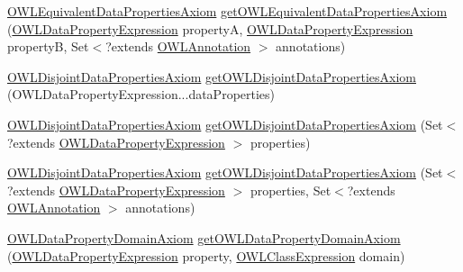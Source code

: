 \begin{DoxyCompactItemize}
\item 
\hyperlink{interfaceorg_1_1semanticweb_1_1owlapi_1_1model_1_1_o_w_l_equivalent_data_properties_axiom}{O\-W\-L\-Equivalent\-Data\-Properties\-Axiom} \hyperlink{interfaceorg_1_1semanticweb_1_1owlapi_1_1model_1_1_o_w_l_data_factory_af0a3a9be69190ea4a642af9ce9a922a2}{get\-O\-W\-L\-Equivalent\-Data\-Properties\-Axiom} (\hyperlink{interfaceorg_1_1semanticweb_1_1owlapi_1_1model_1_1_o_w_l_data_property_expression}{O\-W\-L\-Data\-Property\-Expression} property\-A, \hyperlink{interfaceorg_1_1semanticweb_1_1owlapi_1_1model_1_1_o_w_l_data_property_expression}{O\-W\-L\-Data\-Property\-Expression} property\-B, Set$<$?extends \hyperlink{interfaceorg_1_1semanticweb_1_1owlapi_1_1model_1_1_o_w_l_annotation}{O\-W\-L\-Annotation} $>$ annotations)
\item 
\hyperlink{interfaceorg_1_1semanticweb_1_1owlapi_1_1model_1_1_o_w_l_disjoint_data_properties_axiom}{O\-W\-L\-Disjoint\-Data\-Properties\-Axiom} \hyperlink{interfaceorg_1_1semanticweb_1_1owlapi_1_1model_1_1_o_w_l_data_factory_ad038615dd7ab55496ee50c1059f5e928}{get\-O\-W\-L\-Disjoint\-Data\-Properties\-Axiom} (O\-W\-L\-Data\-Property\-Expression...\-data\-Properties)
\item 
\hyperlink{interfaceorg_1_1semanticweb_1_1owlapi_1_1model_1_1_o_w_l_disjoint_data_properties_axiom}{O\-W\-L\-Disjoint\-Data\-Properties\-Axiom} \hyperlink{interfaceorg_1_1semanticweb_1_1owlapi_1_1model_1_1_o_w_l_data_factory_acf946d25b715532a276bb793c2af4f8a}{get\-O\-W\-L\-Disjoint\-Data\-Properties\-Axiom} (Set$<$?extends \hyperlink{interfaceorg_1_1semanticweb_1_1owlapi_1_1model_1_1_o_w_l_data_property_expression}{O\-W\-L\-Data\-Property\-Expression} $>$ properties)
\item 
\hyperlink{interfaceorg_1_1semanticweb_1_1owlapi_1_1model_1_1_o_w_l_disjoint_data_properties_axiom}{O\-W\-L\-Disjoint\-Data\-Properties\-Axiom} \hyperlink{interfaceorg_1_1semanticweb_1_1owlapi_1_1model_1_1_o_w_l_data_factory_a3d23601af9b8b81ebab8a13b038b7ecb}{get\-O\-W\-L\-Disjoint\-Data\-Properties\-Axiom} (Set$<$?extends \hyperlink{interfaceorg_1_1semanticweb_1_1owlapi_1_1model_1_1_o_w_l_data_property_expression}{O\-W\-L\-Data\-Property\-Expression} $>$ properties, Set$<$?extends \hyperlink{interfaceorg_1_1semanticweb_1_1owlapi_1_1model_1_1_o_w_l_annotation}{O\-W\-L\-Annotation} $>$ annotations)
\item 
\hyperlink{interfaceorg_1_1semanticweb_1_1owlapi_1_1model_1_1_o_w_l_data_property_domain_axiom}{O\-W\-L\-Data\-Property\-Domain\-Axiom} \hyperlink{interfaceorg_1_1semanticweb_1_1owlapi_1_1model_1_1_o_w_l_data_factory_aee21675d6f2a7468faf477d7409507ec}{get\-O\-W\-L\-Data\-Property\-Domain\-Axiom} (\hyperlink{interfaceorg_1_1semanticweb_1_1owlapi_1_1model_1_1_o_w_l_data_property_expression}{O\-W\-L\-Data\-Property\-Expression} property, \hyperlink{interfaceorg_1_1semanticweb_1_1owlapi_1_1model_1_1_o_w_l_class_expression}{O\-W\-L\-Class\-Expression} domain)

\end{DoxyCompactItemize}
